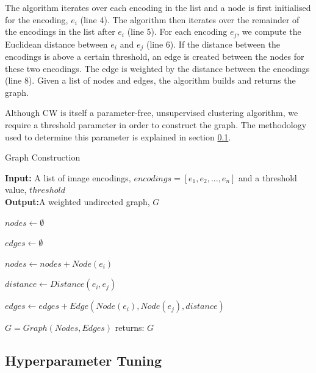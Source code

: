 \documentclass[a4paper,12pt]{report}
\begin{document}
	The algorithm iterates over each encoding in the list and a node is first initialised for the encoding, $e_i$ (line 4). The algorithm then iterates over the remainder of the encodings in the list after $e_i$ (line 5). For each encoding $e_j$, we compute the Euclidean distance between $e_i$ and $e_j$ (line 6). If the distance between the encodings is above a certain threshold, an edge is created between the nodes for these two encodings. The edge is weighted by the distance between the encodings (line 8). Given a list of nodes and edges, the algorithm builds and returns the graph. 
	
	Although CW is itself a parameter-free, unsupervised clustering algorithm, we require a threshold parameter in order to construct the graph. The methodology used to determine this parameter is explained in section \ref{subsection:hyper_tuning}.
	
	\begin{algorithm}[!htbp]
		\small
		\caption{Graph Construction}
		\hspace*{\algorithmicindent} \textbf{Input:} A list of image encodings, $encodings = [e_1, e_2, ..., e_n]$ and a threshold value, $threshold$ \\
		\hspace*{\algorithmicindent} \textbf{Output:}A weighted undirected graph, $G$
		\label{Algorithm:graph_con}
		\begin{algorithmic}[1]
			\State $nodes \gets \emptyset$
			
			\State $edges \gets \emptyset$
			
			\State $nodes \gets nodes + Node(e_i)$
			
			\State $distance \gets Distance(e_i, e_j)$
			
			\State $edges \gets edges + Edge(Node(e_i), Node(e_j), distance)$
			\EndIf
			\EndFor
			\EndFor
			
			\State $G = Graph(Nodes, Edges)$
			\State returns: $G$
			\Statex
		\end{algorithmic}
		\vspace{-0.4cm}%
	\end{algorithm}
	
	\subsection{Hyperparameter Tuning}
	\label{subsection:hyper_tuning}
	
\end{document}

